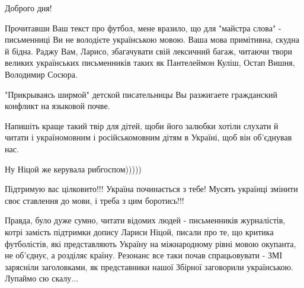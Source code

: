 \begin{itemize}
 
Доброго дня!

Прочитавши Ваш текст про футбол, мене вразило, що для "майстра слова" -
письменниці Ви не володієте українською мовою. Ваша мова примітивна, скудна й
бідна. Раджу Вам, Ларисо, збагачувати свій лексичний багаж, читаючи твори
великих українських письменників таких як Пантелеймон Куліш, Остап Вишня,
Володимир Сосюра.

"Прикрываясь ширмой" детской писательницы Вы разжигаете гражданский конфликт на
языковой почве.

Напишіть краще такий твір для дітей, щоби його залюбки хотіли слухати й читати
і україномовним і російськомовним дітям в Україні, щоб він об'єднував нас.

\begin{itemize}
 
Ну Ніцой же керувала рибгоспом)))))
\end{itemize}

 
Підтримую вас цілковито!!! Україна починається з тебе! Мусять українці змінити своє ставлення до мови, і треба з цим боротись!!!

 

Правда, було дуже сумно, читати відомих людей - письменників журналістів, котрі
замість підтримки допису Лариси Ніцой, писали про те, що критика футболістів,
які представляють Україну на міжнародному рівні мовою окупанта, не об’єднує, а
розділяє країну. Резонанс все таки почав спрацьовувати - ЗМІ зарясніли
заголовками, як представники нашої Збірної заговорили українською. Лупаймо сю
скалу...


\end{itemize}
